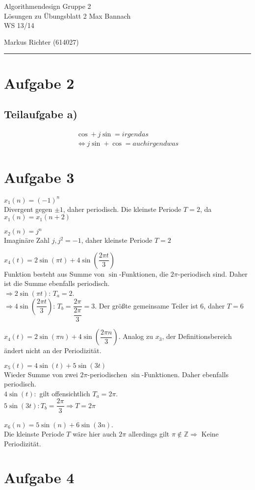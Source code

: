 \documentclass[a4paper, fontsize=10pt]{scrartcl}
\begin{document}
 

{\large Algorithmendesign \hfill Gruppe 2}\\  
{\large Lösungen zu Übungsblatt 2} \hfill Max Bannach\\
{\large WS 13/14}
\begin{flushright}Markus Richter (614027)\end{flushright}
\rule{\textwidth}{.3mm}

\section*{Aufgabe 2}
\subsection*{Teilaufgabe a)}
\begin{align*}
\cos+j\sin=irgendas
\\\Leftrightarrow j\sin+\cos=auch irgendwas
\end{align*}
\section*{Aufgabe 3}
$ x_1(n)=(-1)^n $\\
Divergent gegen $\pm1$, daher periodisch. Die kleinste Periode $T=2$, da $x_1(n)=x_1(n+2)$\bigskip

$ x_2(n)=j^n$\\
Imaginäre Zahl $j, j^2=-1$, daher kleinste Periode $T=2$\bigskip

$x_4(t)=2\sin(\pi t)+4\sin\left( \dfrac{2\pi t}{3}\right)$\\
Funktion besteht aus Summe von $\sin$-Funktionen, die $2\pi $-periodisch sind. Daher ist die Summe ebenfalls periodisch.\\
$\Rightarrow 2\sin (\pi t)$: $T_a=2$.\\$\Rightarrow 4\sin\left( \dfrac{2\pi t}{3}\right)$: $T_b=\dfrac{2\pi}{\dfrac {2\pi}{3}}=3$. Der größte gemeinsame Teiler ist $6$, daher $T=6$\bigskip

$x_4(t)=2\sin(\pi n)+4\sin\left( \dfrac{2\pi n}{3}\right)$. Analog zu $x_3$, der Definitionsbereich ändert nicht an der Periodizität.\bigskip

$x_5(t)=4\sin (t)+5\sin (3t)$\\
Wieder Summe von zwei $2\pi$-periodischen $\sin$-Funktionen. Daher ebenfalls periodisch.\\
$4\sin (t):$ gilt offensichtlich $T_a=2\pi$.\\$5\sin (3t): T_b=\dfrac{2\pi}{3} \Rightarrow T=2\pi$\bigskip

$x_6(n)=5\sin (n)+6\sin (3n)$.\\
Die kleinste Periode $T$ wäre hier auch $2\pi $ allerdings gilt $\pi \notin \mathbb{Z}\Rightarrow$ Keine Periodizität. 


\section*{Aufgabe 4}
\end{document}
